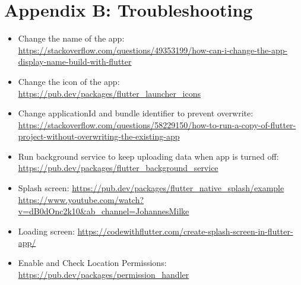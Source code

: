 \documentclass[a4paper]{scrreprt}
\begin{document}
\chapter{Appendix B: Troubleshooting}
\begin{itemize}
    \item Change the name of the app:
    \url{https://stackoverflow.com/questions/49353199/how-can-i-change-the-app-display-name-build-with-flutter}
    
    \item Change the icon of the app:
    \url{https://pub.dev/packages/flutter_launcher_icons}
    
    \item Change applicationId and bundle identifier to prevent overwrite:
    \url{https://stackoverflow.com/questions/58229150/how-to-run-a-copy-of-flutter-project-without-overwriting-the-existing-app}
    
    \item Run background service to keep uploading data when app is turned off:
    \url{https://pub.dev/packages/flutter_background_service}
    
    \item Splash screen:
    \url{https://pub.dev/packages/flutter_native_splash/example}
    \url{https://www.youtube.com/watch?v=dB0dOnc2k10&ab_channel=JohannesMilke}
    
    \item Loading screen:
    \url{https://codewithflutter.com/create-splash-screen-in-flutter-app/}
    
    \item Enable and Check Location Permissions:
    \url{https://pub.dev/packages/permission_handler}
    

\end{itemize}
\end{document}
